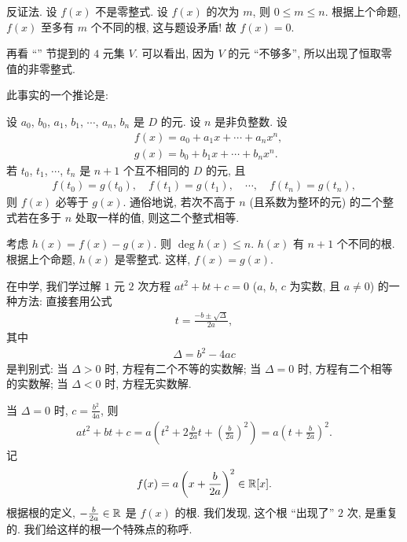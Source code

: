\begin{pf}
    反证法. 设 $f(x)$ 不是零整式. 设 $f(x)$ 的次为 $m$, 则 $0 \leq m \leq n$. 根据上个命题, $f(x)$ 至多有 $m$ 个不同的根, 这与题设矛盾! 故 $f(x) = 0$.
\end{pf}

\begin{remark}
    再看 ``\ValueOfAPolynomialAtAPoint'' 节提到的 $4$ 元集 $V$. 可以看出, 因为 $V$ 的元 ``不够多'', 所以出现了恒取零值的非零整式.
\end{remark}

此事实的一个推论是:

\begin{proposition}
    设 $a_0$, $b_0$, $a_1$, $b_1$, $\cdots$, $a_n$, $b_n$ 是 $D$ 的元. 设 $n$ 是非负整数. 设
    \begin{align*}
         & f(x) = a_0 + a_1 x + \cdots + a_n x^n, \\
         & g(x) = b_0 + b_1 x + \cdots + b_n x^n.
    \end{align*}
    若 $t_0$, $t_1$, $\cdots$, $t_n$ 是 $n+1$ 个互不相同的 $D$ 的元, 且
    \begin{align*}
        f(t_0) = g(t_0), \quad f(t_1) = g(t_1), \quad \cdots, \quad f(t_n) = g(t_n),
    \end{align*}
    则 $f(x)$ 必等于 $g(x)$. 通俗地说, 若次不高于 $n$ (且系数为整环的元) 的二个整式若在多于 $n$ 处取一样的值, 则这二个整式相等.
\end{proposition}

\begin{pf}
    考虑 $h(x) = f(x) - g(x)$. 则 $\deg h(x) \leq n$. $h(x)$ 有 $n+1$ 个不同的根. 根据上个命题, $h(x)$ 是零整式. 这样, $f(x) = g(x)$.
\end{pf}

在中学, 我们学过解 $1$ 元 $2$ 次方程 $at^2 + bt + c = 0$ ($a$, $b$, $c$ 为实数, 且 $a \neq 0$) 的一种方法: 直接套用公式
\begin{align*}
    t = \frac{-b \pm \sqrt{\Delta}}{2a},
\end{align*}
其中
\begin{align*}
    \Delta = b^2 - 4ac
\end{align*}
是判别式: 当 $\Delta > 0$ 时, 方程有二个不等的实数解; 当 $\Delta = 0$ 时, 方程有二个相等的实数解; 当 $\Delta < 0$ 时, 方程无实数解.

当 $\Delta = 0$ 时, $c = \frac{b^2}{4a}$, 则
\begin{align*}
    at^2 + bt + c = a \left( t^2 + 2\frac{b}{2a}t + \left(\frac{b}{2a}\right)^2 \right) = a \left( t + \frac{b}{2a} \right)^2.
\end{align*}
记
$$
    f(x) = a \left( x + \frac{b}{2a} \right)^2 \in \mathbb{R}[x].
$$
根据根的定义, $-\frac{b}{2a} \in \mathbb{R}$ 是 $f(x)$ 的根. 我们发现, 这个根 ``出现了'' $2$ 次, 是重复的. 我们给这样的根一个特殊点的称呼.


